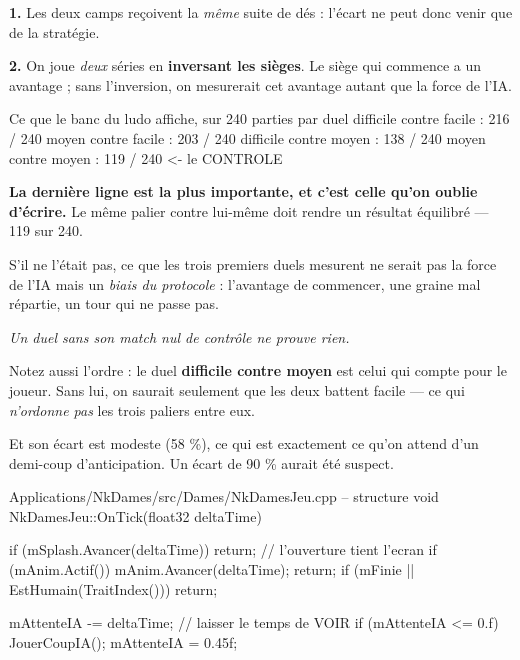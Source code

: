 \begin{nkretenir}
\textbf{1.} Les deux camps reçoivent la \emph{même} suite de dés : l'écart ne
peut donc venir que de la stratégie.

\textbf{2.} On joue \emph{deux} séries en \textbf{inversant les sièges}. Le siège
qui commence a un avantage ; sans l'inversion, on mesurerait cet avantage autant
que la force de l'IA.
\end{nkretenir}

\begin{nkcode}{Ce que le banc du ludo affiche, sur 240 parties par duel}
difficile contre facile : 216 / 240
moyen     contre facile : 203 / 240
difficile contre moyen  : 138 / 240
moyen     contre moyen  : 119 / 240   <- le CONTROLE
\end{nkcode}

\begin{nkretenir}
\textbf{La dernière ligne est la plus importante, et c'est celle qu'on oublie
d'écrire.} Le même palier contre lui-même doit rendre un résultat équilibré ---
119 sur 240.

S'il ne l'était pas, ce que les trois premiers duels mesurent ne serait pas la
force de l'IA mais un \emph{biais du protocole} : l'avantage de commencer, une
graine mal répartie, un tour qui ne passe pas.

\emph{Un duel sans son match nul de contrôle ne prouve rien.}
\end{nkretenir}

\begin{nkretenir}
Notez aussi l'ordre : le duel \textbf{difficile contre moyen} est celui qui
compte pour le joueur. Sans lui, on saurait seulement que les deux battent
facile --- ce qui \emph{n'ordonne pas} les trois paliers entre eux.

Et son écart est modeste (58 \%), ce qui est exactement ce qu'on attend d'un
demi-coup d'anticipation. Un écart de 90 \% aurait été suspect.
\end{nkretenir}

\begin{nkcode}{Applications/NkDames/src/Dames/NkDamesJeu.cpp -- structure}
void NkDamesJeu::OnTick(float32 deltaTime) {
    if (mSplash.Avancer(deltaTime)) { return; }   // l'ouverture tient l'ecran
    if (mAnim.Actif())              { mAnim.Avancer(deltaTime); return; }
    if (mFinie || EstHumain(TraitIndex())) { return; }

    mAttenteIA -= deltaTime;                       // laisser le temps de VOIR
    if (mAttenteIA <= 0.f) { JouerCoupIA(); mAttenteIA = 0.45f; }
}
\end{nkcode}

